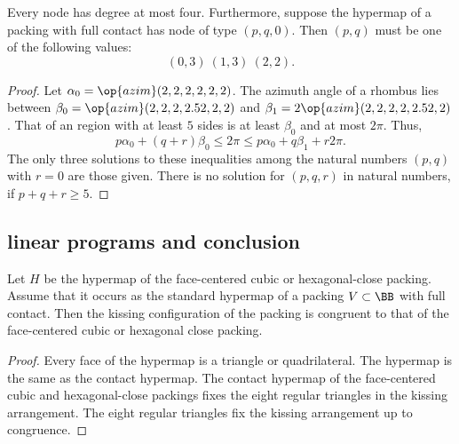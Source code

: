 \begin{lemma}[]\label{lemma:no-5} 
  Every node has degree at most four.  Furthermore, suppose the
  hypermap of a  packing with full contact has node of type
  $(p,q,0)$.  Then $(p,q)$ must be one of the following values:
\begin{displaymath}
(0,3)~(1,3)~(2,2).
\end{displaymath}
\end{lemma}

\begin{proof} Let $\alpha_0 = \op{azim}(2,2,2,2,2,2)$.  The azimuth
  angle of a rhombus lies between $\beta_0 =
  \op{azim}(2,2,2,2.52,2,2)$ and $\beta_1 =
  2\op{azim}(2,2,2,2,2.52,2)$.  That of an region with at least $5$
  sides is at least $\beta_0$ and at most $2\pi$.  Thus,
\begin{displaymath}
p\alpha_0 + (q+r) \beta_0 \le 2\pi \le p\alpha_0 + q\beta_1 + r 2\pi.
\end{displaymath}
The only three solutions to these inequalities among the natural
numbers $(p,q)$ with $r=0$ are those given. There is no solution for
$(p,q,r)$ in natural numbers, if $p+q+r\ge 5$.
\end{proof}





\subsection{linear programs and conclusion}

\begin{lemma}[]\label{lemma:kiss-fcc} Let $H$ be the
  hypermap of the face-centered cubic or hexagonal-close packing.
  Assume that it occurs as the standard hypermap of a  packing $V\subset \BB$
  with full contact.  Then the kissing configuration of the 
  packing is congruent to that of the face-centered cubic or hexagonal
  close packing.
\end{lemma}
%
%
%
%
%

\begin{proof} Every face of the hypermap is a triangle or
  quadrilateral.  The hypermap is the same as the contact hypermap.
  The contact hypermap of the face-centered cubic and hexagonal-close
  packings fixes the eight regular triangles in the kissing
  arrangement.  The eight regular triangles fix the kissing
  arrangement up to congruence.
\end{proof}

